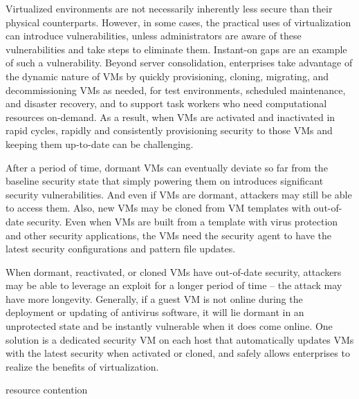 Virtualized environments are not necessarily inherently less secure than their physical counterparts. However, in some cases, the practical uses of virtualization can introduce vulnerabilities, unless administrators are aware of these vulnerabilities and take steps to eliminate them. Instant-on gaps are an example of such a vulnerability.
Beyond server consolidation, enterprises take advantage of the dynamic nature of VMs by quickly provisioning, cloning, migrating, and decommissioning VMs as needed, for test environments, scheduled maintenance, and disaster recovery, and to support task workers who need computational resources on-demand. As a result, when VMs are activated and inactivated in rapid cycles, rapidly and consistently provisioning security to those VMs and keeping them up-to-date can be challenging.

After a period of time, dormant VMs can eventually deviate so far from the baseline security state that simply powering them on introduces significant security vulnerabilities. And even if VMs are dormant, attackers may still be able to access them. Also, new VMs may be cloned from VM templates with out-of-date security. Even when VMs are built from a template with virus protection and other security applications, the VMs need the security agent to have the latest security configurations and pattern file updates.

When dormant, reactivated, or cloned VMs have out-of-date security, attackers may be able to leverage an exploit for a longer period of time – the attack may have more longevity. Generally, if a guest VM is not online during the deployment or updating of antivirus software, it will lie dormant in an unprotected state and be instantly vulnerable when it does come online. One solution is a dedicated security VM on each host that automatically updates VMs with the latest security when activated or cloned, and safely allows enterprises to realize the benefits of virtualization.

resource contention 


